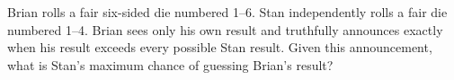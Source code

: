 Brian rolls a fair six-sided die numbered 1--6. Stan independently rolls a fair die numbered 1--4. Brian sees only his own result and truthfully announces exactly when his result exceeds every possible Stan result. Given this announcement, what is Stan's maximum chance of guessing Brian's result?
